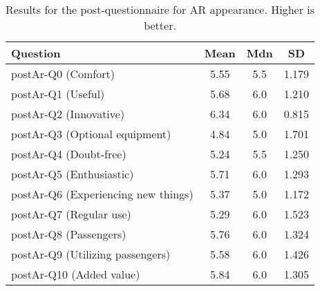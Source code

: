 \begin{table}[H]
    \centering
    \caption{Results for the post-questionnaire for AR appearance. Higher is better.}
    \label{tab:PostArGeneral}
    \begin{tabular}{lccc}
    \toprule
    \textbf{Question}                   & \textbf{Mean}  & \textbf{Mdn}   & \textbf{SD}   \\
    \midrule
    postAr-Q0 (Comfort)                 & 5.55           & 5.5            & 1.179         \\
    postAr-Q1 (Useful)                  & 5.68           & 6.0            & 1.210         \\
    postAr-Q2 (Innovative)              & 6.34           & 6.0            & 0.815         \\
    postAr-Q3 (Optional equipment)      & 4.84           & 5.0            & 1.701         \\
    postAr-Q4 (Doubt-free)              & 5.24           & 5.5            & 1.250         \\
    postAr-Q5 (Enthusiastic)            & 5.71           & 6.0            & 1.293         \\
    postAr-Q6 (Experiencing new things) & 5.37           & 5.0            & 1.172         \\
    postAr-Q7 (Regular use)             & 5.29           & 6.0            & 1.523         \\
    postAr-Q8 (Passengers)              & 5.76           & 6.0            & 1.324         \\
    postAr-Q9 (Utilizing passengers)    & 5.58           & 6.0            & 1.426         \\
    postAr-Q10 (Added value)             & 5.84           & 6.0            & 1.305         \\
    \bottomrule    
    \end{tabular}
\end{table}